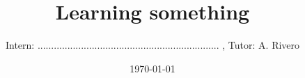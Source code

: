 \documentclass [11pt,twoside,a4paper]{article}
\title{Learning something}
\author{Intern: ................................................................... , Tutor: A. Rivero}
\date{\today}
\begin{document}
\maketitle

\let\clearpage\relax %


%
%
\end{document}
